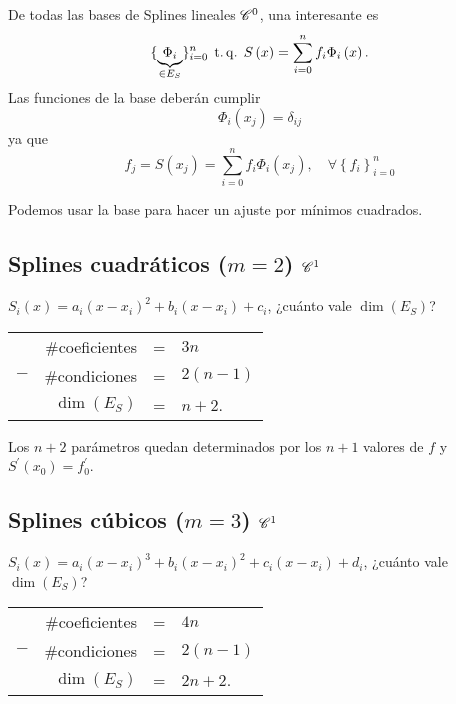 De todas las bases de Splines lineales $\mathscr{C}^0$, una interesante es
\[
    \{ \underbrace{\Phi_i}_{\in E_S} \}_{i=0}^n \operatorname{\;t.q.\;} S\left( x \right) = \sum_{i=0}^n f_i\Phi_i\left( x \right).
\]
Las funciones de la base deberán cumplir
\[
    \Phi_i\left( x_j \right) = \delta_{ij}
\]
ya que
\[
    f_j = S\left( x_j \right) = \sum_{i=0}^n f_i\Phi_i\left( x_j \right),\quad \forall \left\{ f_i \right\}_{i=0}^n
\]

\begin{obs}
    Podemos usar la base para hacer un ajuste por mínimos cuadrados.
\end{obs}

\subsection{Splines cuadráticos ($m=2$) $\mathscr{C}^1$}

$S_i\left( x \right) = a_i\left( x-x_i \right)^2 + b_i \left( x-x_i \right) + c_i$, ¿cuánto vale $\dim\left( E_S \right)$?

\begin{center}
    \begin{tabular}{crcl}
        & $\#$coeficientes &=& $3n$\\
        $-$ & $\#$condiciones &=& $2\left( n-1\right)$\\\hline
        &$\dim\left( E_S \right)$ &=& $n+2$.
    \end{tabular}
\end{center}

Los $n+2$ parámetros quedan determinados por los $n+1$ valores de $f$ y $S^{\prime}\left( x_0 \right) = f^{\prime}_0$.

\subsection{Splines cúbicos ($m=3$) $\mathscr{C}^1$}

$S_i\left( x \right) = a_i\left( x-x_i \right)^3 + b_i \left( x-x_i \right)^2 + c_i\left( x-x_i \right) + d_i$, ¿cuánto vale $\dim\left( E_S \right)$?

\begin{center}
    \begin{tabular}{crcl}
        & $\#$coeficientes &=& $4n$\\
        $-$ & $\#$condiciones &=& $2\left( n-1\right)$\\\hline
        &$\dim\left( E_S \right)$ &=& $2n+2$.
    \end{tabular}
\end{center}


